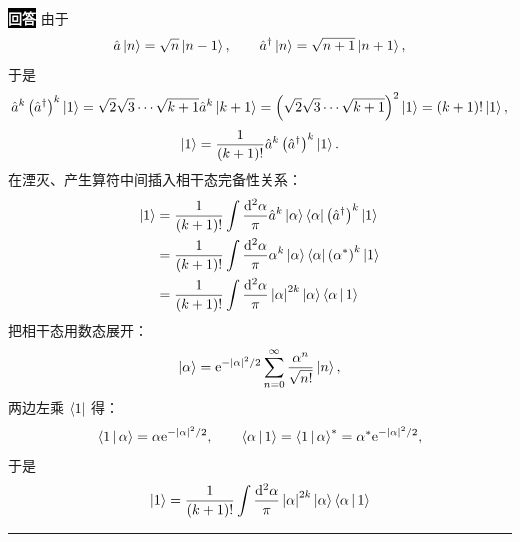 \documentclass[11pt,a4paper]{ctexart}
\newenvironment{answer}
  {\par\smallskip\noindent
   \begingroup
   \setlength{\fboxsep}{4pt}%
   \colorbox{black}{\textcolor{white}{\bfseries 回答}}%
   \endgroup
   \quad\ignorespaces}
  {\par\smallskip\noindent\rule{\linewidth}{0.4pt}\medskip}
\begin{document}
\begin{answer}
  由于
  \begin{equation}
    \hat{a} \Ket{n } = \sqrt{n}\Ket{n-1 },\qquad
    \hat{a}^\dag \Ket{n } = \sqrt{n+1} \Ket{n+1 },
  \end{equation}
  于是
  \begin{equation}
    \begin{aligned}
      \hat{a}^k\left(\hat{a}^\dag \right)^k\Ket{1 }
      =\sqrt{2}\sqrt{3}\cdots\sqrt{k+1} \hat{a}^k \Ket{k+1 }
      =\left(\sqrt{2}\sqrt{3}\cdots\sqrt{k+1} \right)^2 \Ket{1 }
      =(k+1)! \Ket{1 },
    \end{aligned}
  \end{equation}
  \begin{equation}
    \Ket{1 }
    =\frac{1 }{(k+1)! }\hat{a}^k \left(\hat{a}^\dag \right)^k \Ket{1 }.
  \end{equation}
  在湮灭、产生算符中间插入相干态完备性关系：
  \begin{equation}
    \begin{aligned}
      \Ket{1 }
      &=\frac{1 }{(k+1)! } \int \frac{\mathrm{d}^2\alpha }{\pi } \hat{a}^k \Ket{\alpha } \Bra{\alpha } \left(\hat{a}^\dag \right)^k \Ket{1 } \\
      &=\frac{1 }{(k+1)! } \int \frac{\mathrm{d}^2\alpha }{\pi } \alpha^k \Ket{\alpha } \Bra{\alpha } \left(\alpha^* \right)^k \Ket{1 } \\
      &=\frac{1 }{(k+1)! } \int \frac{\mathrm{d}^2\alpha }{\pi } \left|\alpha \right|^{2k} \Ket{\alpha } \Braket{\alpha|1 } \\
    \end{aligned}
  \end{equation}
  把相干态用数态展开：
  \begin{equation}
    \Ket{\alpha }
    =\mathrm{e}^{-\left|\alpha \right|^2/2} \sum_{n=0}^{\infty} \frac{\alpha^n }{\sqrt{n!} } \Ket{n }, 
  \end{equation}
  两边左乘 $\Bra{1 } $ 得：
  \begin{equation}
    \Braket{1|\alpha }
    =\alpha \mathrm{e}^{-\left|\alpha \right|^2/2},\qquad
    \Braket{\alpha|1 }
    =\Braket{1|\alpha }^*
    =\alpha^* \mathrm{e}^{-\left|\alpha \right|^2/2},
  \end{equation}
  于是
  \begin{equation}
    \begin{aligned}
      \Ket{1 }
      &=\frac{1 }{(k+1)! } \int \frac{\mathrm{d}^2\alpha }{\pi } \left|\alpha \right|^{2k} \Ket{\alpha } \Braket{\alpha|1 } \\

\end{aligned}
\end{equation}
\end{answer}
\end{document}
